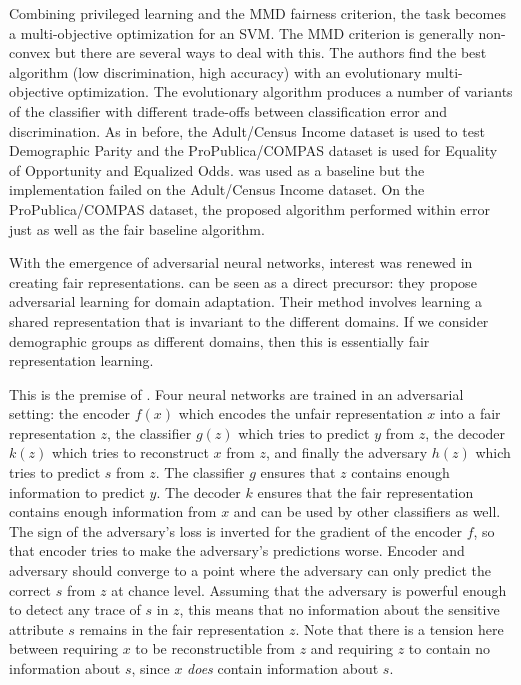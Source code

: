 Combining privileged learning and the MMD fairness criterion,
the task becomes a multi-objective optimization for an SVM.
The MMD criterion is generally non-convex but there are several ways to deal with this.
The authors find the best algorithm (low discrimination, high accuracy)
with an evolutionary multi-objective optimization.
The evolutionary algorithm produces a number of variants of the classifier
with different trade-offs between classification error and discrimination.
As in \citet{zafar2017fairnesstreatment} before,
the Adult/Census Income dataset is used to test Demographic Parity
and the ProPublica/COMPAS dataset is used for Equality of Opportunity and Equalized Odds.
\citet{zafar2017fairnesstreatment} was used as a baseline
but the implementation failed on the Adult/Census Income dataset.
On the ProPublica/COMPAS dataset,
the proposed algorithm performed within error just as well as the fair baseline algorithm.

With the emergence of adversarial neural networks, interest was renewed in creating fair representations.
\citet{ganin2016domain} can be seen as a direct precursor:
they propose adversarial learning for domain adaptation.
Their method involves learning a shared representation that is invariant to the different domains.
If we consider demographic groups as different domains, then this is essentially fair representation learning.

This is the premise of \citet{edwards2016censoring}.
Four neural networks are trained in an adversarial setting:
the encoder \(f(x)\) which encodes the unfair representation \(x\) into a fair representation \(z\),
the classifier \(g(z)\) which tries to predict \(y\) from \(z\),
the decoder \(k(z)\) which tries to reconstruct \(x\) from \(z\),
and finally the adversary \(h(z)\) which tries to predict \(s\) from \(z\).
The classifier \(g\) ensures that \(z\) contains enough information to predict \(y\).
The decoder \(k\) ensures that the fair representation contains enough information from \(x\)
and can be used by other classifiers as well.
The sign of the adversary's loss is inverted for the gradient of the encoder \(f\),
so that encoder tries to make the adversary's predictions worse.
Encoder and adversary should converge to a point
where the adversary can only predict the correct \(s\) from \(z\) at chance level.
Assuming that the adversary is powerful enough to detect any trace of \(s\) in \(z\),
this means that no information about the sensitive attribute \(s\) remains in the fair representation \(z\).
Note that there is a tension here between requiring \(x\) to be reconstructible from \(z\)
and requiring \(z\) to contain no information about \(s\), since \(x\) \emph{does} contain information about \(s\).

